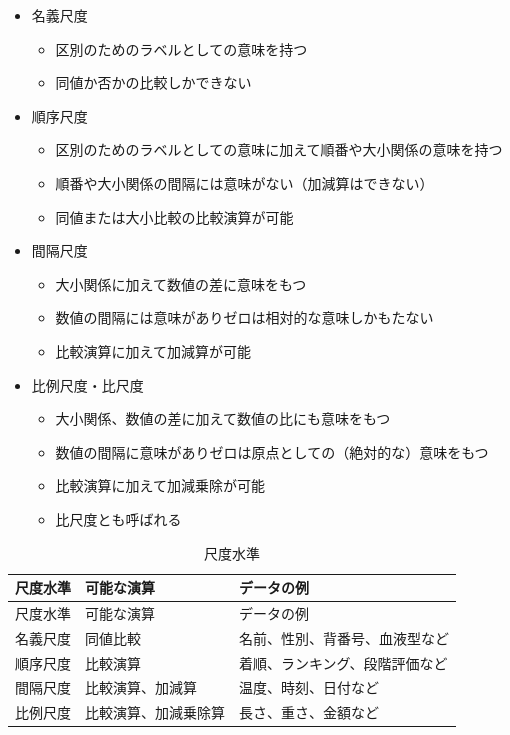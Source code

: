 \documentclass[
  12pt,
]{book}
\providecommand{\tightlist}{%
  \setlength{\itemsep}{0pt}\setlength{\parskip}{0pt}}
\begin{document}
\begin{itemize}
\tightlist
\item
  名義尺度

  \begin{itemize}
  \tightlist
  \item
    区別のためのラベルとしての意味を持つ
  \item
    同値か否かの比較しかできない
  \end{itemize}
\item
  順序尺度

  \begin{itemize}
  \tightlist
  \item
    区別のためのラベルとしての意味に加えて順番や大小関係の意味を持つ
  \item
    順番や大小関係の間隔には意味がない（加減算はできない）
  \item
    同値または大小比較の比較演算が可能
  \end{itemize}
\item
  間隔尺度

  \begin{itemize}
  \tightlist
  \item
    大小関係に加えて数値の差に意味をもつ
  \item
    数値の間隔には意味がありゼロは相対的な意味しかもたない
  \item
    比較演算に加えて加減算が可能
  \end{itemize}
\item
  比例尺度・比尺度

  \begin{itemize}
  \tightlist
  \item
    大小関係、数値の差に加えて数値の比にも意味をもつ
  \item
    数値の間隔に意味がありゼロは原点としての（絶対的な）意味をもつ
  \item
    比較演算に加えて加減乗除が可能
  \item
    比尺度とも呼ばれる
  \end{itemize}
\end{itemize}

\begin{longtable}[]{@{}lll@{}}
\caption{尺度水準}\tabularnewline
\toprule
尺度水準 & 可能な演算 & データの例 \\
\midrule
\endfirsthead
\toprule
尺度水準 & 可能な演算 & データの例 \\
\midrule
\endhead
名義尺度 & 同値比較 & 名前、性別、背番号、血液型など \\
順序尺度 & 比較演算 & 着順、ランキング、段階評価など \\
間隔尺度 & 比較演算、加減算 & 温度、時刻、日付など \\
比例尺度 & 比較演算、加減乗除算 & 長さ、重さ、金額など \\
\bottomrule
\end{longtable}
\end{document}
